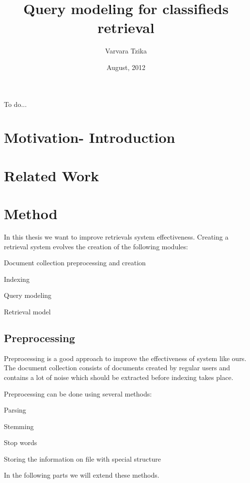 \documentclass{article}
\title{Query modeling for classifieds retrieval}
\author{Varvara Tzika}
\date{August, 2012}
\begin{document}
\maketitle

\abstract

To do...

\section{Motivation- Introduction}

\section{Related Work}

\section{Method}
In this thesis we want to improve retrievals system effectiveness. Creating a retrieval system evolves the creation of the following modules:
\begin{list}{.}{}
\item Document collection preprocessing and creation
\item Indexing
\item Query modeling
\item Retrieval model
\end{list}

\subsection{Preprocessing}

Preprocessing is a good approach to improve the effectiveness of system like ours. The document collection consists of documents created by regular users and contains a lot of noise which should be extracted before indexing takes place.

Preprocessing can be done using several methods:
\begin{list}{.}{}
\item Parsing
\item Stemming
\item Stop words
\item Storing the information on file with special structure

\end{list}

In the following parts we will extend these methods.
\end{document}

